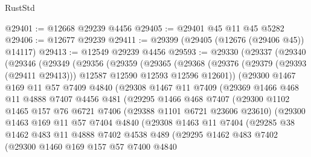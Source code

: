 \begin{lexlean}{RustStd}
\begin{coremodule}
@29401 := @12668 @29239 @4456
@29405 := @29401 @45 @11 @45 @5282
@29406 := @12677 @29239
@29411 := @29399 (@29405 (@12676 (@29406 @45)) @14117)
@29413 := @12549 @29239 @4456
@29593 := @29330
    (@29337
      (@29340
        (@29346
          (@29349
            (@29356
              (@29359
                (@29365
                  (@29368
                    (@29376 (@29379 (@29393 (@29411 @29413))) @12587 @12590 @12593 @12596 @12601))
                  (@29300
                    @1467
                    @169
                    @11
                    @57
                    @7409
                    @4840
                    (@29308
                      @1467
                      @11
                      @7409
                      (@29369
                        @1466
                        @468
                        @11
                        @4888
                        @7407
                        @4456
                        @481
                        (@29295
                          @1466
                          @468
                          @7407
                          (@29300
                            @1102
                            @1465
                            @157
                            @76
                            @6721
                            @7406
                            (@29388 @1101 @6721 @23606 @23610)
                            (@29300
                              @1463
                              @169
                              @11
                              @57
                              @7404
                              @4840
                              (@29308
                                @1463
                                @11
                                @7404
                                (@29285
                                  @38
                                  @1462
                                  @483
                                  @11
                                  @4888
                                  @7402
                                  @4538
                                  @489
                                  (@29295
                                    @1462
                                    @483
                                    @7402
                                    (@29300
                                      @1460
                                      @169
                                      @157
                                      @57
                                      @7400
                                      @4840

\end{coremodule}
\end{lexlean}
